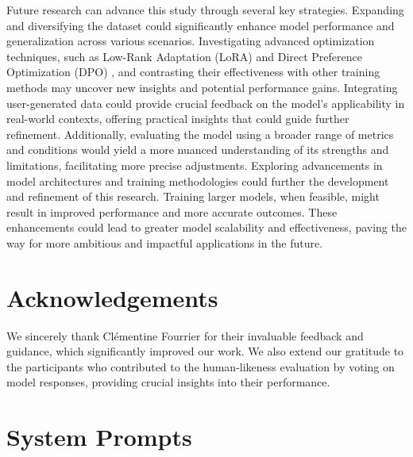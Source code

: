 \documentclass{article}
\begin{document}
Future research can advance this study through several key strategies. Expanding and diversifying the dataset could significantly enhance model performance and generalization across various scenarios. Investigating advanced optimization techniques, such as Low-Rank Adaptation (LoRA) \cite{hu2021loralowrankadaptationlarge} and Direct Preference Optimization (DPO) \cite{rafailov2024directpreferenceoptimizationlanguage}, and contrasting their effectiveness with other training methods may uncover new insights and potential performance gains.
\vspace{-0.02cm}
Integrating user-generated data could provide crucial feedback on the model’s applicability in real-world contexts, offering practical insights that could guide further refinement. Additionally, evaluating the model using a broader range of metrics and conditions would yield a more nuanced understanding of its strengths and limitations, facilitating more precise adjustments.
\vspace{-0.02cm}
Exploring advancements in model architectures and training methodologies could further the development and refinement of this research. Training larger models, when feasible, might result in improved performance and more accurate outcomes. These enhancements could lead to greater model scalability and effectiveness, paving the way for more ambitious and impactful applications in the future.
\vspace{-0.13cm}
\section*{Acknowledgements}
\vspace{-0.13cm}
We sincerely thank Clémentine Fourrier for their invaluable feedback and guidance, which significantly improved our work. We also extend our gratitude to the participants who contributed to the human-likeness evaluation by voting on model responses, providing crucial insights into their performance.


\clearpage
\appendix
\label{sec:appendices}
\section{System Prompts}
\label{sec:prompts}
\end{document}
